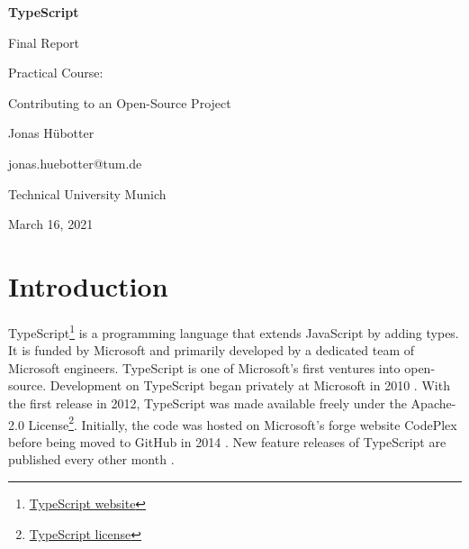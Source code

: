 \documentclass[12pt]{scrartcl}
\begin{document}

\begin{titlepage}
    \begin{center}
        \vspace*{\fill}

        \Huge
        \textbf{TypeScript}

        \LARGE
        Final Report

        \vspace{0.5cm}
        \large
        Practical Course:\par
        Contributing to an Open-Source Project

        \vspace{5cm}

        Jonas Hübotter

        \small
        jonas.huebotter@tum.de

        \vspace{0.5cm}

        Technical University Munich

        March 16, 2021

        \vspace*{\fill}
    \end{center}
\end{titlepage}


\setcounter{tocdepth}{2}
\tableofcontents{}
\clearpage

\section{Introduction}

TypeScript\footnote{\href{https://www.typescriptlang.org/}{TypeScript website}} is a programming language that extends JavaScript by adding types. It is funded by Microsoft and primarily developed by a dedicated team of Microsoft engineers. TypeScript is one of Microsoft's first ventures into open-source. Development on TypeScript began privately at Microsoft in 2010 \cite{Tung2020}. With the first release in 2012, TypeScript was made available freely under the Apache-2.0 License\footnote{\href{https://github.com/microsoft/TypeScript/blob/master/LICENSE.txt}{TypeScript license}}. Initially, the code was hosted on Microsoft's forge website CodePlex before being moved to GitHub in 2014 \cite{Turner2014}. New feature releases of TypeScript are published every other month \cite{Rosenwasser2017}.
\end{document}
